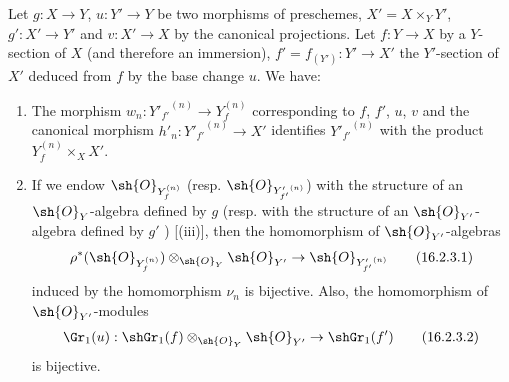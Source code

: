 \begin{corollary}[16.2.3]
\label{IV.16.2.3}
Let $g: X \to Y$, $u: Y' \to Y$ be two morphisms of preschemes, $X' = X \times_Y Y'$, $g': X' \to Y'$ and $v: X' \to X$ by the canonical projections. Let $f: Y \to X$ by a $Y$-section of $X$ (and therefore an immersion), $f' = f_{(Y')}: Y' \to X'$ the $Y'$-section of $X'$ deduced from $f$ by the base change $u$.
We have:
\begin{enumerate}
  \item[{\rm(i)}] The morphism $w_n:{Y'_{f'}}^{(n)} \to Y_f^{(n)}$ corresponding to $f$, $f'$, $u$, $v$  and the canonical morphism $h'_n: {Y'_{f'}}^{(n)} \to X'$ identifies $ {Y'_{f'}}^{(n)}$ with the product $Y_f^{(n)} \times_X X'$.
  \item[{\rm(ii)}] If we endow $\sh{O}_{Y_f^{(n)}}$ (resp. $\sh{O}_{{Y'_{f'}}^{(n)}}$) with the structure of an $\sh{O}_Y$-algebra defined by $g$ (resp. with the structure of an $\sh{O}_{Y'}$-algebra defined by $g'$ ) [(iii)],
  then the homomorphism of $\sh{O}_{Y'}$-algebras
  \[
    \label{IV.16.2.3.1}
    \rho^*(\sh{O}_{Y_f^{(n)}})\otimes_{\sh{O}_Y} \sh{O}_{Y'} \to \sh{O}_{{Y'_{f'}}^{(n)}}
    \tag{16.2.3.1}
  \]
  induced by the homomorphism $\nu_n$  is bijective.
  Also, the homomorphism of $\sh{O}_{Y'}$-modules
  \[
    \label{IV.16.2.3.2}
    \Gr_1(u): \shGr_1(f)\otimes_{\sh{O}_Y} \sh{O}_{Y'} \to \shGr_1(f')
    \tag{16.2.3.2}
  \]
  is bijective.
 \end{enumerate} 
\end{corollary}

